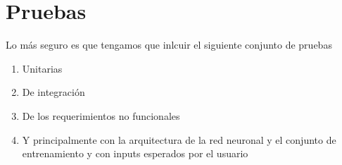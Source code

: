 \chapter{Pruebas}

Lo más seguro es que tengamos que inlcuir el siguiente conjunto de pruebas

\begin{enumerate}
    \item Unitarias
    \item De integración
    \item De los requerimientos no funcionales
    \item Y principalmente con la arquitectura de la red neuronal y el conjunto de entrenamiento y con inputs esperados por el usuario
\end{enumerate}{}